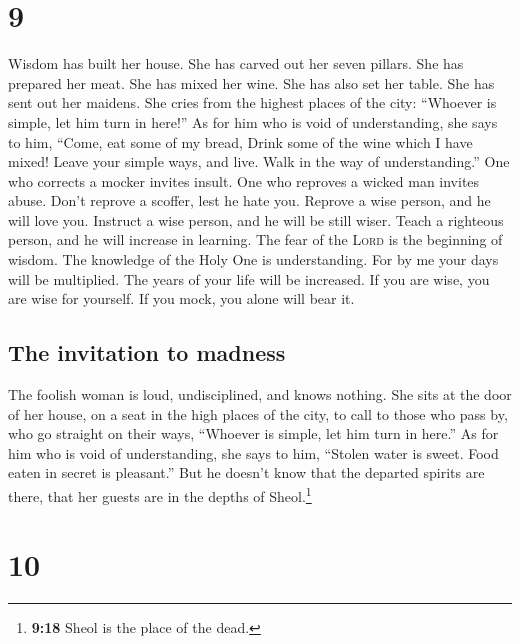 \hypertarget{section-8}{%
\section{9}\label{section-8}}

 Wisdom has built her house. She has carved out her seven
pillars.  She has prepared her meat. She has mixed her
wine. She has also set her table.  She has sent out her
maidens. She cries from the highest places of the city: 
``Whoever is simple, let him turn in here!'' As for him who is void of
understanding, she says to him,  ``Come, eat some of my
bread, Drink some of the wine which I have mixed!  Leave
your simple ways, and live. Walk in the way of understanding.''
 One who corrects a mocker invites insult. One who
reproves a wicked man invites abuse.  Don't reprove a
scoffer, lest he hate you. Reprove a wise person, and he will love you.
 Instruct a wise person, and he will be still wiser. Teach
a righteous person, and he will increase in learning. 
The fear of the \textsc{Lord} is the beginning of wisdom. The knowledge
of the Holy One is understanding.  For by me your days
will be multiplied. The years of your life will be increased.
 If you are wise, you are wise for yourself. If you mock,
you alone will bear it.

\hypertarget{the-invitation-to-madness}{%
\subsection{The invitation to madness}\label{the-invitation-to-madness}}

 The foolish woman is loud, undisciplined, and knows
nothing.  She sits at the door of her house, on a seat in
the high places of the city,  to call to those who pass
by, who go straight on their ways,  ``Whoever is simple,
let him turn in here.'' As for him who is void of understanding, she
says to him,  ``Stolen water is sweet. Food eaten in
secret is pleasant.''  But he doesn't know that the
departed spirits are there, that her guests are in the depths of
Sheol.\footnote{\textbf{9:18} Sheol is the place of the dead.}

\hypertarget{section-9}{%
\section{10}\label{section-9}}


